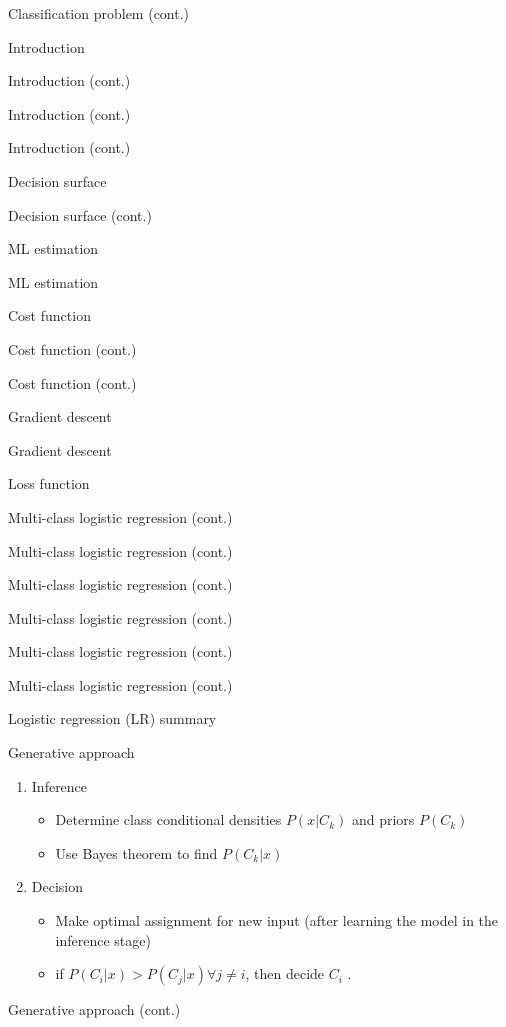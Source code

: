 \documentclass[serif, aspectratio=169]{beamer}
\begin{document}
\begin{frame}{Classification problem (cont.)}
\begin{itemize}
\begin{frame}{Introduction}
\begin{itemize}
\begin{frame}{Introduction (cont.)}
\begin{frame}{Introduction (cont.)}
\begin{frame}{Introduction (cont.)}
\begin{frame}{Decision surface}
\begin{itemize}
\begin{frame}{Decision surface (cont.)}
\begin{frame}{ML estimation}
\begin{frame}{ML estimation}
\begin{itemize}
\begin{frame}{Cost function}
\begin{frame}{Cost function (cont.)}
\begin{itemize}
\begin{itemize}
\begin{frame}{Cost function (cont.)}
\begin{frame}{Gradient descent}
\begin{frame}{Gradient descent}
\begin{frame}{Loss function}
\begin{frame}{Multi-class logistic regression (cont.)}
\begin{frame}{Multi-class logistic regression (cont.)}
\begin{frame}{Multi-class logistic regression (cont.)}
\begin{frame}{Multi-class logistic regression (cont.)}
\begin{frame}{Multi-class logistic regression (cont.)}
\begin{frame}{Multi-class logistic regression (cont.)}
\begin{frame}{Logistic regression (LR) summary}
\begin{itemize}
\begin{frame}{Generative approach}
    \begin{enumerate}
        \item Inference
        \begin{itemize}
            \item Determine class conditional densities $P(x|C_k)$ and priors $P(C_k)$
            \item Use Bayes theorem to find $P(C_k|x)$
        \end{itemize}
        \item Decision
        \begin{itemize}
            \item Make optimal assignment for new input (after learning the model in the inference stage)
            \item if $P(C_i|x) > P(C_j|x) \forall j \neq i$, then decide $C_i$ .
        \end{itemize}
    \end{enumerate}
\end{frame}

\begin{frame}{Generative approach (cont.)}


\end{frame}
\end{itemize}
\end{frame}
\end{frame}
\end{frame}
\end{frame}
\end{frame}
\end{frame}
\end{frame}
\end{frame}
\end{frame}
\end{frame}
\end{frame}
\end{itemize}
\end{itemize}
\end{frame}
\end{frame}
\end{itemize}
\end{frame}
\end{frame}
\end{frame}
\end{itemize}
\end{frame}
\end{frame}
\end{frame}
\end{frame}
\end{itemize}
\end{frame}
\end{itemize}
\end{frame}
\end{document}
